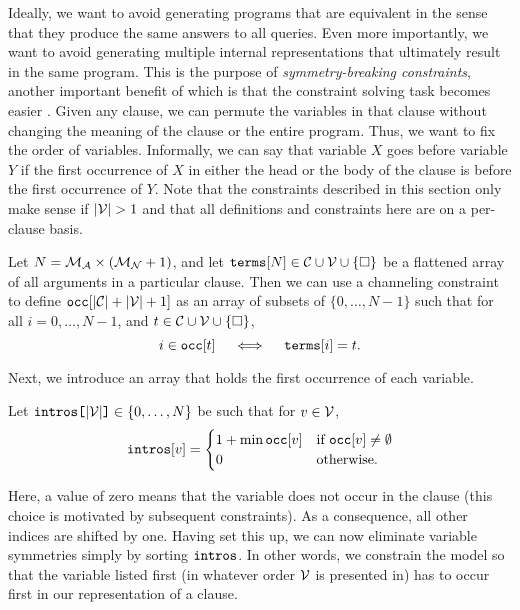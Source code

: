 Ideally, we want to avoid generating programs that are equivalent in the sense
that they produce the same answers to all queries. Even more importantly, we
want to avoid generating multiple internal representations that ultimately
result in the same program. This is the purpose of \emph{symmetry-breaking
  constraints}, another important benefit of which is that the constraint
solving task becomes easier \citep{DBLP:conf/cp/Walsh06}. Given any clause, we
can permute the variables in that clause without changing the meaning of the
clause or the entire program. Thus, we want to fix the order of variables.
Informally, we can say that variable $X$ goes before variable $Y$ if the first
occurrence of $X$ in either the head or the body of the clause is before the
first occurrence of $Y$. Note that the constraints described in this section
only make sense if $|\mathcal{V}{}| > 1$ and that all definitions and constraints
here are on a per-clause basis.
\begin{definition}
  Let $N = \mathcal{M}_{\mathcal{A}}{} \times (\mathcal{M}_{\mathcal{N}}{} + 1)$, and let
  $\texttt{\textup{terms}}[N] \in \mathcal{C}{} \cup \mathcal{V}{} \cup \{ \Box
  \}$ be a flattened array of all arguments in a particular clause. Then we can
  use a channeling constraint to define $\texttt{\textup{occ}}[|\mathcal{C}{}| +
  |\mathcal{V}{}| + 1]$ as an array of subsets of $\{ 0, \dots, N-1 \}$ such that
  for all $i = 0, \dots, N - 1$, and $t \in \mathcal{C}{} \cup \mathcal{V}{} \cup
  \{ \Box \}$,
  \[
    i \in \texttt{\textup{occ}}[t] \quad \iff \quad
    \texttt{\textup{terms}}[i] = t.
  \]
\end{definition}
Next, we introduce an array that holds the first occurrence of each variable.
\begin{definition}
  Let $\texttt{\textup{{intros}[}}{|\mathcal{V}{}|}\texttt{\textup{]}} \in {\{ 0, \dots, N \}}$ be such that
  for $v \in \mathcal{V}{}$,
  \[
    \texttt{\textup{intros}}[v] = \begin{cases}
      1 + \min \texttt{\textup{occ}}[v] & \text{if }
      \texttt{\textup{occ}}[v] \ne \emptyset\\
      0 & \text{otherwise.}
    \end{cases}
  \]
\end{definition}
Here, a value of zero means that the variable does not occur in the clause (this
choice is motivated by subsequent constraints). As a consequence, all other
indices are shifted by one. Having set this up, we can now eliminate variable
symmetries simply by sorting $\texttt{\textup{intros}}$. In other words, we constrain
the model so that the variable listed first (in whatever order $\mathcal{V}{}$ is
presented in) has to occur first in our representation of a clause.

